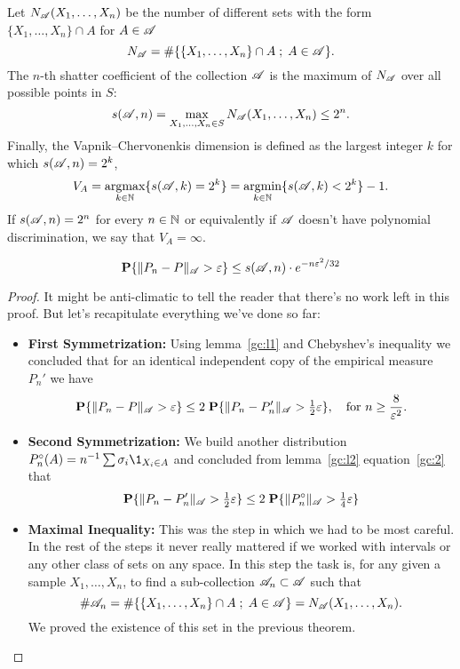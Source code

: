 \begin{definition}
    Let $N_\AA (X_1,\ldots, X_n)$ be the number of different sets with the form $\{X_1,\ldots,X_n\}\cap A$ for $A \in \AA$
\[ N_\AA = \#\{\{X_1,\ldots,X_n\}\cap A \; ;\; A\in\AA\}.  \] 
The $n$-th shatter coefficient of the collection $\AA$ is the maximum of $N_\AA$ over all possible points in $S$:
\[ s(\AA, n) = \max_{X_1,\ldots, X_n \in S} N_\AA(X_1,\ldots, X_n) \leq 2^n. \]
Finally, the Vapnik–Chervonenkis dimension is defined as the largest integer $k$ for which $s(\AA, n) = 2^k$,
\[ V_A = \underset{k\in \N}{\text{argmax}} \{s(\AA, k) = 2^k\} = \underset{k\in \N}{\text{argmin}} \{s(\AA, k) < 2^k\} - 1. \]  
If $s(\AA, n) = 2^n$ for every $n\in \N$ or equivalently if $\AA$ doesn't have polynomial discrimination, we say that $V_A = \infty$.
\end{definition}

\begin{theorem}\label{vc:inequality}
 \[\P\{\|P_n-P\|_{\AA} > \varepsilon\} \leq s(\AA, n) \cdot e^{-n \varepsilon^2 / 32} \] 
\end{theorem}
\begin{proof}
    It might be anti-climatic to tell the reader that there's no work left in this proof. But let's recapitulate everything we've done so far:
    \begin{itemize}
        \item \textbf{First Symmetrization:} Using {lemma}~\ref{gc:l1} and Chebyshev's inequality we concluded that for an identical independent copy of the empirical measure $P_n'$ we have
        \[ \P\{\|P_n - P\|_\AA > \varepsilon\} \leq 2 \; \P\{\|P_n-P_n'\|_\AA > \tfrac{1}{2}\varepsilon\},\hspace*{1em}\text{for } n \geq \frac{8}{\varepsilon^2}.\] 
        \item \textbf{Second Symmetrization:} We build another distribution $P_n^\circ(A) = n^{-1}\sum \sigma_i \1_{X_i \in A} $ and concluded from {lemma}~\ref{gc:l2} equation~\ref{gc:2} that
        \[ \P\{\|P_n-P_n'\|_\AA > \tfrac{1}{2}\varepsilon\} \leq 2\; \P\{\|P_n^\circ\|_\AA > \tfrac{1}{4}\varepsilon\}   \]
        \item \textbf{Maximal Inequality:} This was the step in which we had to be most careful. In the rest of the steps it never really mattered if we worked with intervals or any other class of sets on any space. In this step the task is, for any given a sample $X_1, \ldots, X_n$, to find a sub-collection $\AA_n \subset \AA$ such that
        \[ \#\AA_n = \#\{\{X_1,\ldots,X_n\}\cap A \; ;\; A\in\AA\} = N_\AA(X_1,\ldots, X_n).\] 
        We proved the existence of this set in the previous theorem.
    \end{itemize}
\end{proof}

